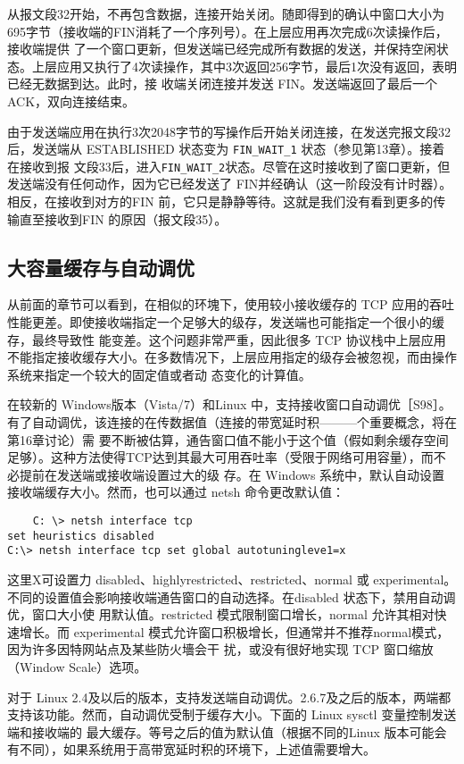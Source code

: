 从报文段32开始，不再包含数据，连接开始关闭。随即得到的确认中窗口大小为695字节（接收端的FIN消耗了一个序列号）。在上层应用再次完成6次读操作后，接收端提供
了一个窗口更新，但发送端已经完成所有数据的发送，并保持空闲状态。上层应用又执行了4次读操作，其中3次返回256字节，最后1次没有返回，表明已经无数据到达。此时，接
收端关闭连接并发送 FIN。发送端返回了最后一个 ACK，双向连接结束。

由于发送端应用在执行3次2048字节的写操作后开始关闭连接，在发送完报文段32后，发送端从 ESTABLISHED 状态变为 \verb|FIN_WAIT_1| 状态（参见第13章）。接着在接收到报
文段33后，进入\verb|FIN_WAIT_2|状态。尽管在这时接收到了窗口更新，但发送端没有任何动作，因为它已经发送了 FIN并经确认（这一阶段没有计时器）。相反，在接收到对方的FIN
前，它只是静静等待。这就是我们没有看到更多的传输直至接收到FIN 的原因（报文段35）。

\subsection{大容量缓存与自动调优}
从前面的章节可以看到，在相似的环塊下，使用较小接收缓存的 TCP 应用的吞吐性能更差。即使接收端指定一个足够大的级存，发送端也可能指定一个很小的缓存，最终导致性
能变差。这个问题非常严重，因此很多 TCP 协议栈中上层应用不能指定接收缓存大小。在多数情况下，上层应用指定的级存会被忽视，而由操作系统来指定一个较大的固定值或者动
态变化的计算值。

在较新的 Windows版本（Vista/7）和Linux 中，支持接收窗口自动调优［S98］。有了自动调优，该连接的在传数据值（连接的带宽延时积———个重要概念，将在第16章讨论）需
要不断被估算，通告窗口值不能小于这个值（假如剩余缓存空间足够）。这种方法使得TCP达到其最大可用吞吐率（受限于网络可用容量），而不必提前在发送端或接收端设置过大的级
存。在 Windows 系统中，默认自动设置接收端缓存大小。然而，也可以通过 netsh 命令更改默认值：
\begin{verbatim}
    C: \> netsh interface tcp
set heuristics disabled
C:\> netsh interface tcp set global autotuningleve1=x
\end{verbatim}

这里X可设置力 disabled、highlyrestricted、restricted、normal 或 experimental。不同的设置值会影响接收端通告窗口的自动选择。在disabled 状态下，禁用自动调优，窗口大小使
用默认值。restricted 模式限制窗口增长，normal 允许其相对快速增长。而 experimental 模式允许窗口积极增长，但通常并不推荐normal模式，因为许多因特网站点及某些防火墻会干
扰，或没有很好地实现 TCP 窗口缩放（Window Scale）选项。

对于 Linux 2.4及以后的版本，支持发送端自动调优。2.6.7及之后的版本，两端都支持该功能。然而，自动调优受制于缓存大小。下面的 Linux sysctl 变量控制发送端和接收端的
最大缓存。等号之后的值为默认值（根据不同的Linux 版本可能会有不同），如果系统用于高带宽延时积的环境下，上述值需要增大。

